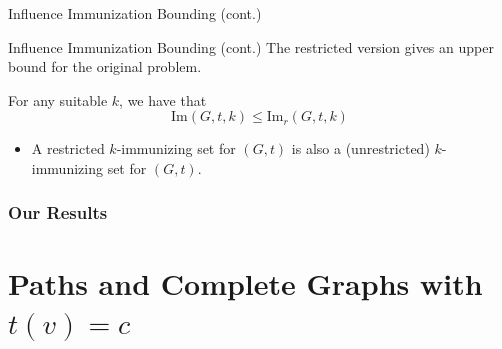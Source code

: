 \documentclass[10pt,aspectratio=169,english]{beamer}
\begin{document}
\begin{frame}{Influence Immunization Bounding (cont.)}
\begin{minipage}[t]{0.4\textwidth}
{\begin{figure}
			\end{figure}
		}
		
		
	\end{minipage}
	
\end{frame}

\begin{frame}{Influence Immunization Bounding (cont.)}
	The restricted version gives an upper bound for the original problem.
	
	\begin{remark}
		For any suitable $k$, we have that $$\text{Im}(G, t, k) \leq \text{Im}_r(G, t, k)$$
	\end{remark}
	
	\begin{itemize}
		\item<1-> A restricted $k$-immunizing set for $(G, t)$ is also a (unrestricted) $k$-immunizing set for $(G, t)$.
	\end{itemize}
\end{frame}

\section{Our Results}

\begin{frame}
	\sectionpage
\end{frame}

\part{Paths and Complete Graphs with $t(v) = c$}

\begin{frame}
	\partpage
\end{frame}
\end{document}

